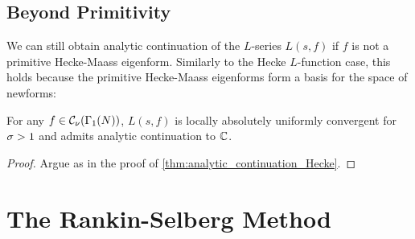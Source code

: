     \subsection*{Beyond Primitivity}
      We can still obtain analytic continuation of the $L$-series $L(s,f)$ if $f$ is not a primitive Hecke-Maass eigenform. Similarly to the Hecke $L$-function case, this holds because the primitive Hecke-Maass eigenforms form a basis for the space of newforms:

      \begin{theorem}\label{thm:analytic_continuation_Hecke-Maass}
        For any $f \in \mathcal{C}_{\nu}(\Gamma_{1}(N))$, $L(s,f)$ is locally absolutely uniformly convergent for $\sigma > 1$ and admits analytic continuation to $\mathbb{C}$.
      \end{theorem}
      \begin{proof}
        Argue as in the proof of \cref{thm:analytic_continuation_Hecke}.
      \end{proof}
  \section{The Rankin-Selberg Method}
